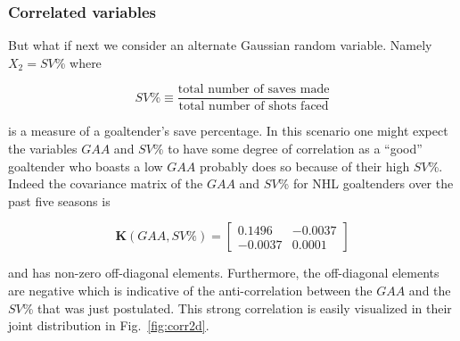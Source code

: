 \subsubsection{Correlated variables}
But what if next we consider an alternate Gaussian random variable. Namely
$X_2 = SV$\% where

\begin{equation}
  SV\% \equiv \frac{\text{total number of saves made}}{\text{total number of shots faced}}
\end{equation}

\noindent is a measure of a goaltender's save percentage. In this scenario one
might expect the variables $GAA$ and $SV$\% to have some degree of correlation
as a ``good'' goaltender who boasts a low $GAA$ probably does so because of their
high $SV$\%. Indeed the covariance matrix of the $GAA$ and $SV$\% for NHL
goaltenders over the past five seasons is

\begin{equation}
  \mathbf{K}(GAA,SV\%) =
  \begin{bmatrix}
    0.1496 & -0.0037 \\
    -0.0037 & 0.0001
  \end{bmatrix}
  \label{eq:Kcorr}
\end{equation}

\noindent and has non-zero off-diagonal elements. Furthermore, the off-diagonal
elements are negative which is indicative of the anti-correlation between the
$GAA$ and the $SV$\% that was just postulated. This strong correlation
is easily visualized in their joint distribution in Fig.~\ref{fig:corr2d}. \\


